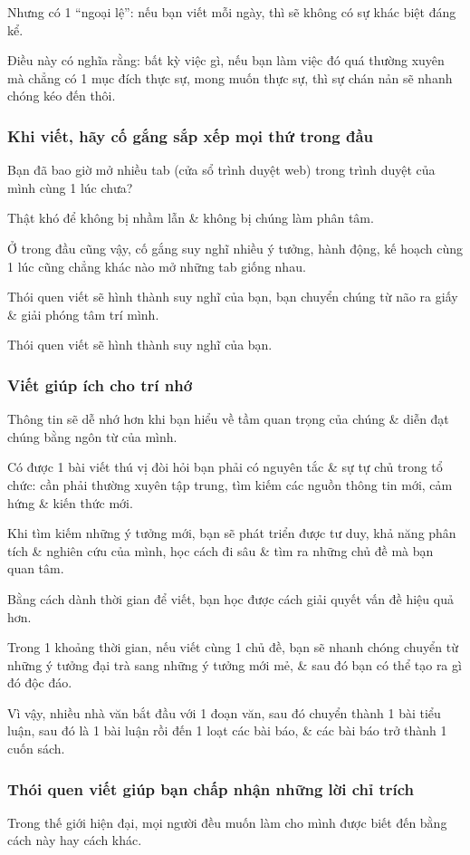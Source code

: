 \documentclass{article}
\begin{document}
%
Nhưng có 1 ``ngoại lệ'': nếu bạn viết mỗi ngày, thì sẽ không có sự khác biệt đáng kể.

Điều này có nghĩa rằng: bất kỳ việc gì, nếu bạn làm việc đó quá thường xuyên mà chẳng có 1 mục đích thực sự, mong muốn thực sự, thì sự chán nản sẽ nhanh chóng kéo đến thôi.

\subsubsection{Khi viết, hãy cố gắng sắp xếp mọi thứ trong đầu}
Bạn đã bao giờ mở nhiều tab (cửa sổ trình duyệt web) trong trình duyệt của mình cùng 1 lúc chưa?

Thật khó để không bị nhầm lẫn \& không bị chúng làm phân tâm.

Ở trong đầu cũng vậy, cố gắng suy nghĩ nhiều ý tưởng, hành động, kế hoạch cùng 1 lúc cũng chẳng khác nào mở những tab giống nhau.

Thói quen viết sẽ hình thành suy nghĩ của bạn, bạn chuyển chúng từ não ra giấy \& giải phóng tâm trí mình.

\textsf{Thói quen viết sẽ hình thành suy nghĩ của bạn.}

\subsubsection{Viết giúp ích cho trí nhớ}
Thông tin sẽ dễ nhớ hơn khi bạn hiểu về tầm quan trọng của chúng \& diễn đạt chúng bằng ngôn từ của mình.

Có được 1 bài viết thú vị đòi hỏi bạn phải có nguyên tắc \& sự tự chủ trong tổ chức: cần phải thường xuyên tập trung, tìm kiếm các nguồn thông tin mới, cảm hứng \& kiến thức mới.

%
Khi tìm kiếm những ý tưởng mới, bạn sẽ phát triển được tư duy, khả năng phân tích \& nghiên cứu của mình, học cách đi sâu \& tìm ra những chủ đề mà bạn quan tâm.

Bằng cách dành thời gian để viết, bạn học được cách giải quyết vấn đề hiệu quả hơn.

%
Trong 1 khoảng thời gian, nếu viết cùng 1 chủ đề, bạn sẽ nhanh chóng chuyển từ những ý tưởng đại trà sang những ý tưởng mới mẻ, \& sau đó bạn có thể tạo ra gì đó độc đáo.

Vì vậy, nhiều nhà văn bắt đầu với 1 đoạn văn, sau đó chuyển thành 1 bài tiểu luận, sau đó là 1 bài luận rồi đến 1 loạt các bài báo, \& các bài báo trở thành 1 cuốn sách.

\subsubsection{Thói quen viết giúp bạn chấp nhận những lời chỉ trích}
Trong thế giới hiện đại, mọi người đều muốn làm cho mình được biết đến bằng cách này hay cách khác.
\end{document}
